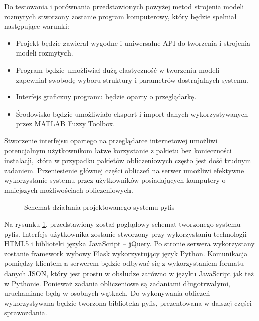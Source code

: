 \documentclass[a4paper,12pt,titlepage]{article}
\begin{document}
Do testowania i porównania przedstawionych powyżej metod strojenia modeli rozmytych stworzony zostanie program komputerowy, który będzie spełniał następujące warunki:
\begin{itemize}
\item Projekt będzie zawierał wygodne i uniwersalne API do tworzenia i strojenia modeli rozmytych.
\item Program będzie umożliwiał dużą elastyczność w tworzeniu modeli --- zapewniał swobodę wyboru struktury i parametrów dostrajalnych systemu.
\item Interfejs graficzny programu będzie oparty o przeglądarkę.
\item Środowisko będzie umożliwiało eksport i import danych wykorzystywanych przez MATLAB Fuzzy Toolbox.
\end{itemize}

Stworzenie interfejsu opartego na przeglądarce internetowej umożliwi potencjalnym użytkownikom łatwe korzystanie z pakietu bez konieczności instalacji, która w przypadku pakietów obliczeniowych często jest dość trudnym zadaniem. Przeniesienie głównej części obliczeń na serwer umożliwi efektywne wykorzystanie systemu przez użytkowników posiadających komputery o mniejszych możliwościach obliczeniowych.

\begin{figure}[h]
\caption{Schemat działania projektowanego systemu pyfis}
\label{schemat}
\end{figure}

Na rysunku \ref{schemat}. przedstawiony został poglądowy schemat tworzonego systemu pyfis. Interfejs użytkownika zostanie stworzony przy wykorzystaniu technologii HTML5 i biblioteki języka JavaScript -- jQuery. Po stronie serwera wykorzystany zostanie framework wybowy Flask wykorzystujący język Python. Komunikacja pomiędzy klientem a serwerem będzie odbywać się z wykorzystaniem formatu danych JSON, który jest prostu w obsłudze zarówno w języku JavaScript jak też w Pythonie. Ponieważ zadania obliczeniowe są zadaniami długotrwałymi, uruchamiane będą w osobnych wątkach. Do wykonywania obliczeń wykorzystywana będzie tworzona biblioteka pyfis, prezentowana w dalszej części sprawozdania.
\end{document}
